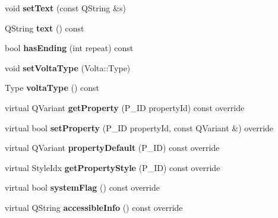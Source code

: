 \begin{DoxyCompactItemize}
\mbox{\label{class_ms_1_1_volta_a11ca3f5fda27ba2deb99c704ebe9963e}} 
void {\bfseries set\+Text} (const Q\+String \&s)
\item 
\mbox{\label{class_ms_1_1_volta_a558679d726bf6af220df9466c53a469b}} 
Q\+String {\bfseries text} () const
\item 
\mbox{\label{class_ms_1_1_volta_ac95a27383bd00256d4a1ca43ef67f026}} 
bool {\bfseries has\+Ending} (int repeat) const
\item 
\mbox{\label{class_ms_1_1_volta_a2ada1cdbc429adb4dd7f57d8bf2a6c8d}} 
void {\bfseries set\+Volta\+Type} (Volta\+::\+Type)
\item 
\mbox{\label{class_ms_1_1_volta_aceb18de16b85fd5afb60fdff8076f6d1}} 
Type {\bfseries volta\+Type} () const
\item 
\mbox{\label{class_ms_1_1_volta_a419b9f4b483f37aa9c1eb75e31cbfe17}} 
virtual Q\+Variant {\bfseries get\+Property} (P\+\_\+\+ID property\+Id) const override
\item 
\mbox{\label{class_ms_1_1_volta_a49a496efbe4090f9e15745b01cec8ff6}} 
virtual bool {\bfseries set\+Property} (P\+\_\+\+ID property\+Id, const Q\+Variant \&) override
\item 
\mbox{\label{class_ms_1_1_volta_a4e9ea8b07706d996b1c187328829e9ad}} 
virtual Q\+Variant {\bfseries property\+Default} (P\+\_\+\+ID) const override
\item 
\mbox{\label{class_ms_1_1_volta_a5c300deb5f4bd6161eef28ff7fa5d6ae}} 
virtual Style\+Idx {\bfseries get\+Property\+Style} (P\+\_\+\+ID) const override
\item 
\mbox{\label{class_ms_1_1_volta_a4ba39e8375bab0116c6bc33d777ab019}} 
virtual bool {\bfseries system\+Flag} () const override
\item 
\mbox{\label{class_ms_1_1_volta_a85e173087d26829591905540c3936306}} 
virtual Q\+String {\bfseries accessible\+Info} () const override
\end{DoxyCompactItemize}
